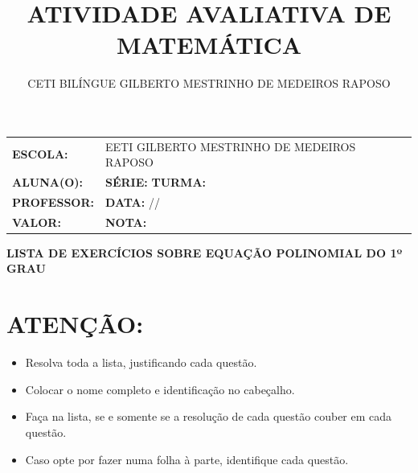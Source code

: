 \documentclass[a4paper,12pt]{article}
\title{ATIVIDADE AVALIATIVA DE MATEMÁTICA}
\author{CETI BILÍNGUE GILBERTO MESTRINHO DE MEDEIROS RAPOSO}
\date{}
\begin{document}
	\Large
	\onehalfspacing
	\vspace{1cm}
	\begin{center}
    	\begin{tabularx}{\textwidth}{|l >{\raggedright\arraybackslash}X|}
        	\hline
        	\textbf{ESCOLA:} & EETI GILBERTO MESTRINHO DE MEDEIROS RAPOSO \\
        	\textbf{ALUNA(O):} & \underline{\hspace{5cm}} \textbf{SÉRIE:} \underline{\hspace{1cm}} \textbf{TURMA:} \underline{\hspace{1cm}} \\
        	\textbf{PROFESSOR:} & \underline{\hspace{5cm}} \textbf{DATA:} \underline{\hspace{1cm}}/\underline{\hspace{1.5cm}}/\underline{\hspace{1cm}} \\
        	\textbf{VALOR:} & \underline{\hspace{3cm}} \textbf{NOTA:} \underline{\hspace{2cm}} \\
        	\hline
    		\end{tabularx}
		\end{center}
		\vspace{1cm}
	
	\begin{center}
		\Large\textbf{LISTA DE EXERCÍCIOS SOBRE EQUAÇÃO POLINOMIAL DO 1º GRAU}
	\end{center}
	
	\vspace{0.5cm}
	
	\section*{ATENÇÃO:}
	\begin{itemize}[noitemsep]
		\item Resolva toda a lista, justificando cada questão.
		\item Colocar o nome completo e identificação no cabeçalho.
		\item Faça na lista, se e somente se a resolução de cada questão couber em cada questão.
		\item Caso opte por fazer numa folha à parte, identifique cada questão.
	\end{itemize}
	
\end{document}
